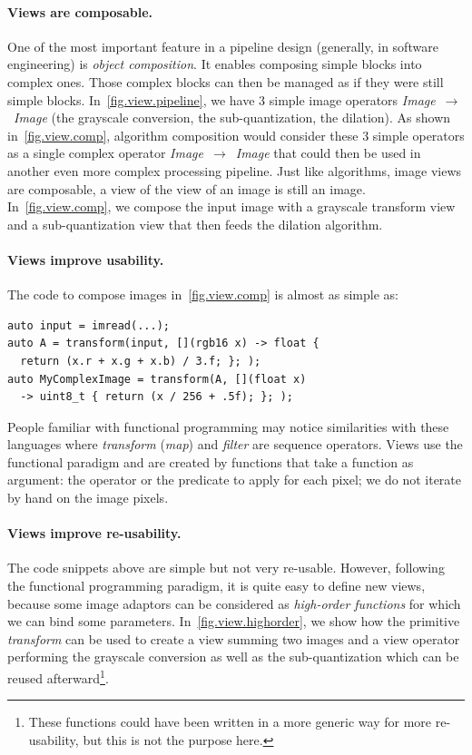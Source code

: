 \paragraph{Views are composable.} One of the most important feature in a pipeline design (generally, in software
engineering) is \emph{object composition}. It enables composing simple blocks into complex ones. Those complex blocks
can then be managed as if they were still simple blocks. In~\cref{fig.view.pipeline}, we have 3 simple image operators
\emph{Image}~\(\rightarrow\)~\emph{Image} (the grayscale conversion, the sub-quantization, the dilation). As shown
in~\cref{fig.view.comp}, algorithm composition would consider these 3 simple operators as a single complex operator
\emph{Image}~\(\rightarrow\)~\emph{Image} that could then be used in another even more complex processing pipeline. Just
like algorithms, image views are composable, \eg a view of the view of an image is still an image.
In~\cref{fig.view.comp}, we compose the input image with a grayscale transform view and a sub-quantization view that
then feeds the dilation algorithm.

\paragraph{Views improve usability.} The code to compose images in~\cref{fig.view.comp} is almost as simple as:

\begin{verbatim}
auto input = imread(...);
auto A = transform(input, [](rgb16 x) -> float {
  return (x.r + x.g + x.b) / 3.f; }; );
auto MyComplexImage = transform(A, [](float x)
  -> uint8_t { return (x / 256 + .5f); }; );
\end{verbatim}

People familiar with functional programming may notice similarities with these languages where \emph{transform}
(\emph{map}) and \emph{filter} are sequence operators. Views use the functional paradigm and are created by functions
that take a function as argument: the operator or the predicate to apply for each pixel; we do not iterate by hand on
the image pixels.

\paragraph{Views improve re-usability.} The code snippets above are simple but not very re-usable. However, following the
functional programming paradigm, it is quite easy to define new views, because some image adaptors can be considered as
\emph{high-order functions} for which we can bind some parameters. In~\cref{fig.view.highorder}, we show how the
primitive \emph{transform} can be used to create a view summing two images and a view operator performing the grayscale
conversion as well as the sub-quantization which can be reused afterward\footnote{These functions could have been
  written in a more generic way for more re-usability, but this is not the purpose here.}.


